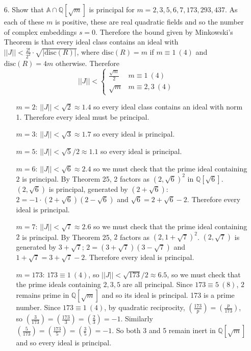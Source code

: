 \documentclass{article}
\newcommand{\Q}[0]{\mathbb{Q}}
\newcommand{\disc}[1]{\text{disc}(#1)}
\newcommand{\modequiv}[3]{#1 \equiv #2\ (#3)}
\newcommand{\ringofintegers}[1]{\mathbb{A} \cap #1}
\newcommand{\legendre}[2]{\genfrac{(}{)}{}{}{#1}{#2}}
\begin{document}
\begin{enumerate}
\item[6.] Show that $\ringofintegers{\Q[\sqrt{m}]}$ is principal for $m = 2, 3, 5, 6, 7, 173, 293, 437$.  As each of these $m$ is positive, these are real quadratic fields and so the number of complex embeddings $s = 0$.  Therefore the bound given by Minkowski's Theorem is that every ideal class contains an ideal with $||J|| < \frac{2!}{2^2} \cdot \sqrt{|\disc{R}|}$, where $\disc{R} = m$ if $\modequiv{m}{1}{4}$ and $\disc{R} = 4m$ otherwise.  Therefore \[ ||J|| < \begin{cases}\frac{\sqrt{m}}{2} &\modequiv{m}{1}{4}\\ \sqrt{m} &\modequiv{m}{2, 3}{4}\end{cases} \]

    \begin{itemize}
        \item[$m = 2$: ] $||J|| < \sqrt{2} \approx 1.4$ so every ideal class contains an ideal with norm 1.  Therefore every ideal must be principal.
        \item[$m = 3$: ] $||J|| < \sqrt{3} \approx 1.7$ so every ideal is principal.
        \item[$m = 5$: ] $||J|| < \sqrt{5} / 2 \approx 1.1$ so every ideal is principal.
        \item[$m = 6$: ] $||J|| < \sqrt{6} \approx 2.4$ so we must check that the prime ideal containing $2$ is principal.  By Theorem 25, 2 factors as $(2, \sqrt{6})^2$ in $\Q[\sqrt{6}]$.  $(2, \sqrt{6})$ is principal, generated by $(2 + \sqrt{6})$: $2 = -1 \cdot (2 + \sqrt{6})(2 - \sqrt{6})$ and $\sqrt{6} = 2 + \sqrt{6} - 2$.  Therefore every ideal is principal.
        \item[$m = 7$: ] $||J|| < \sqrt{7} \approx 2.6$ so we must check that the prime ideal containing $2$ is principal.  By Theorem 25, $2$ factors as $(2, 1 + \sqrt{7})^2$.  $(2, \sqrt{7})$ is generated by $3 + \sqrt{7}$; $2 = (3 + \sqrt{7})(3 - \sqrt{7})$ and $1 + \sqrt{7} = 3 + \sqrt{7} - 2$.  Therefore every ideal is principal.
        \item[$m = 173$: ] $\modequiv{173}{1}{4}$, so $||J|| < \sqrt{173} / 2 \approx 6.5$, so we must check that the prime ideals containing $2, 3, 5$ are all principal.  Since $\modequiv{173}{5}{8}$, $2$ remains prime in $\Q[\sqrt{m}]$ and so its ideal is principal.  173 is a prime number.  Since $\modequiv{173}{1}{4}$, by quadratic reciprocity, $\legendre{173}{p} = \legendre{p}{173}$, so $\legendre{3}{173} = \legendre{173}{3} = \legendre{2}{3} = -1$. Similarly $\legendre{5}{173} = \legendre{173}{5} = \legendre{3}{5} = -1$.  So both 3 and 5 remain inert in $\Q[\sqrt{m}]$ and so every ideal is principal.

\end{itemize}
\end{enumerate}
\end{document}
